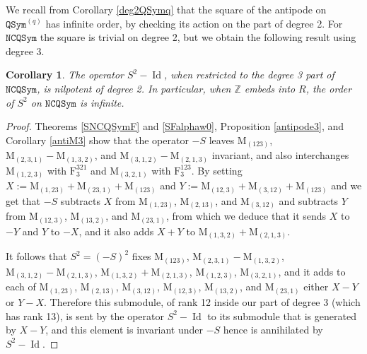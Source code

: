 \documentclass{article}
\newtheorem{cor}[thm]{Corollary}
\theoremstyle{definition}
\begin{document}
\medskip

We recall from Corollary \ref{deg2QSymq} that the square of the antipode on $\mathtt{QSym}^{(q)}$ has infinite order, by checking its action on the part of degree 2. For $\mathtt{NCQSym}$ the square is trivial on degree 2, but we obtain the following result using degree 3.
\begin{cor}
The operator $S^{2}-\operatorname{Id}$, when restricted to the degree 3 part of $\mathtt{NCQSym}$, is nilpotent of degree 2. In particular, when $\mathbb{Z}$ embeds into $R$, the order of $S^{2}$ on $\mathtt{NCQSym}$ is infinite. \label{deg3NCQSym}
\end{cor}

\begin{proof}
Theorems \ref{SNCQSymF} and \ref{SFalphaw0}, Proposition \ref{antipode3}, and Corollary \ref{antiM3} show that the operator $-S$ leaves $\mathrm{M}_{(123)}$, $\mathrm{M}_{(2,3,1)}-\mathrm{M}_{(1,3,2)}$, and $\mathrm{M}_{(3,1,2)}-\mathrm{M}_{(2,1,3)}$ invariant, and also interchanges $\mathrm{M}_{(1,2,3)}$ with $\mathrm{F}_{3}^{321}$ and $\mathrm{M}_{(3,2,1)}$ with $\mathrm{F}_{3}^{123}$. By setting $X:=\mathrm{M}_{(1,23)}+\mathrm{M}_{(23,1)}+\mathrm{M}_{(123)}$ and $Y:=\mathrm{M}_{(12,3)}+\mathrm{M}_{(3,12)}+\mathrm{M}_{(123)}$ and we get that $-S$ subtracts $X$ from $\mathrm{M}_{(1,23)}$, $\mathrm{M}_{(2,13)}$, and $\mathrm{M}_{(3,12)}$ and subtracts $Y$ from $\mathrm{M}_{(12,3)}$, $\mathrm{M}_{(13,2)}$, and $\mathrm{M}_{(23,1)}$, from which we deduce that it sends $X$ to $-Y$ and $Y$ to $-X$, and it also adds $X+Y$ to $\mathrm{M}_{(1,3,2)}+\mathrm{M}_{(2,1,3)}$.

It follows that $S^{2}=(-S)^{2}$ fixes $\mathrm{M}_{(123)}$, $\mathrm{M}_{(2,3,1)}-\mathrm{M}_{(1,3,2)}$, $\mathrm{M}_{(3,1,2)}-\mathrm{M}_{(2,1,3)}$, $\mathrm{M}_{(1,3,2)}+\mathrm{M}_{(2,1,3)}$, $\mathrm{M}_{(1,2,3)}$, $\mathrm{M}_{(3,2,1)}$, and it adds to each of $\mathrm{M}_{(1,23)}$, $\mathrm{M}_{(2,13)}$, $\mathrm{M}_{(3,12)}$, $\mathrm{M}_{(12,3)}$, $\mathrm{M}_{(13,2)}$, and $\mathrm{M}_{(23,1)}$ either $X-Y$ or $Y-X$. Therefore this submodule, of rank 12 inside our part of degree 3 (which has rank 13), is sent by the operator $S^{2}-\operatorname{Id}$ to its submodule that is generated by $X-Y$, and this element is invariant under $-S$ hence is annihilated by $S^{2}-\operatorname{Id}$.


\end{proof}
\end{document}
